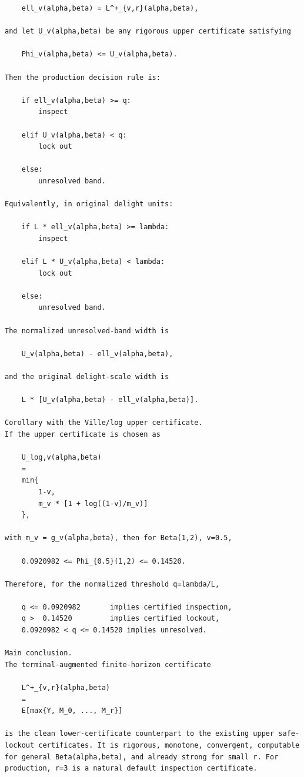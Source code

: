 \begin{small}
\begin{verbatim}
    ell_v(alpha,beta) = L^+_{v,r}(alpha,beta),

and let U_v(alpha,beta) be any rigorous upper certificate satisfying

    Phi_v(alpha,beta) <= U_v(alpha,beta).

Then the production decision rule is:

    if ell_v(alpha,beta) >= q:
        inspect

    elif U_v(alpha,beta) < q:
        lock out

    else:
        unresolved band.

Equivalently, in original delight units:

    if L * ell_v(alpha,beta) >= lambda:
        inspect

    elif L * U_v(alpha,beta) < lambda:
        lock out

    else:
        unresolved band.

The normalized unresolved-band width is

    U_v(alpha,beta) - ell_v(alpha,beta),

and the original delight-scale width is

    L * [U_v(alpha,beta) - ell_v(alpha,beta)].

Corollary with the Ville/log upper certificate.
If the upper certificate is chosen as

    U_log,v(alpha,beta)
    =
    min{
        1-v,
        m_v * [1 + log((1-v)/m_v)]
    },

with m_v = g_v(alpha,beta), then for Beta(1,2), v=0.5,

    0.0920982 <= Phi_{0.5}(1,2) <= 0.14520.

Therefore, for the normalized threshold q=lambda/L,

    q <= 0.0920982       implies certified inspection,
    q >  0.14520         implies certified lockout,
    0.0920982 < q <= 0.14520 implies unresolved.

Main conclusion.
The terminal-augmented finite-horizon certificate

    L^+_{v,r}(alpha,beta)
    =
    E[max{Y, M_0, ..., M_r}]

is the clean lower-certificate counterpart to the existing upper safe-lockout certificates. It is rigorous, monotone, convergent, computable for general Beta(alpha,beta), and already strong for small r. For production, r=3 is a natural default inspection certificate.
\end{verbatim}
\end{small}
